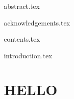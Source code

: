 \documentclass{bris}
\begin{document}

\maketitle

\frontmatter

\makedecl

{abstract.tex}

{acknowledgements.tex}

{contents.tex}
\cleardoublepage

\mainmatter

{introduction.tex}

\clearpage

\section{HELLO}
\end{document}
